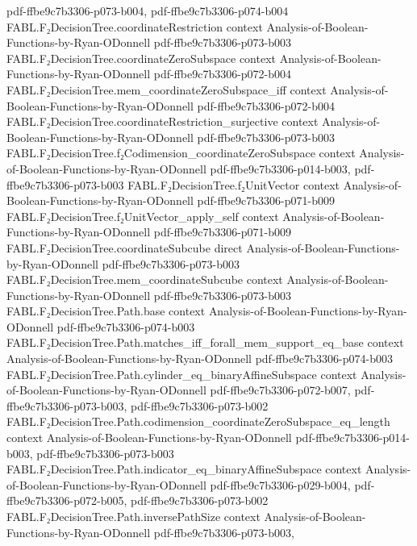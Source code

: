 \begin{theorem}
  {pdf-ffbe9c7b3306-p073-b004,
    pdf-ffbe9c7b3306-p074-b004}
\proofstep
  {FABL.F₂DecisionTree.coordinateRestriction}
  {context}
  {Analysis-of-Boolean-Functions-by-Ryan-ODonnell}
  {pdf-ffbe9c7b3306-p073-b003}
\proofstep
  {FABL.F₂DecisionTree.coordinateZeroSubspace}
  {context}
  {Analysis-of-Boolean-Functions-by-Ryan-ODonnell}
  {pdf-ffbe9c7b3306-p072-b004}
\proofstep
  {FABL.F₂DecisionTree.mem_coordinateZeroSubspace_iff}
  {context}
  {Analysis-of-Boolean-Functions-by-Ryan-ODonnell}
  {pdf-ffbe9c7b3306-p072-b004}
\proofstep
  {FABL.F₂DecisionTree.coordinateRestriction_surjective}
  {context}
  {Analysis-of-Boolean-Functions-by-Ryan-ODonnell}
  {pdf-ffbe9c7b3306-p073-b003}
\proofstep
  {FABL.F₂DecisionTree.f₂Codimension_coordinateZeroSubspace}
  {context}
  {Analysis-of-Boolean-Functions-by-Ryan-ODonnell}
  {pdf-ffbe9c7b3306-p014-b003,
    pdf-ffbe9c7b3306-p073-b003}
\proofstep
  {FABL.F₂DecisionTree.f₂UnitVector}
  {context}
  {Analysis-of-Boolean-Functions-by-Ryan-ODonnell}
  {pdf-ffbe9c7b3306-p071-b009}
\proofstep
  {FABL.F₂DecisionTree.f₂UnitVector_apply_self}
  {context}
  {Analysis-of-Boolean-Functions-by-Ryan-ODonnell}
  {pdf-ffbe9c7b3306-p071-b009}
\proofstep
  {FABL.F₂DecisionTree.coordinateSubcube}
  {direct}
  {Analysis-of-Boolean-Functions-by-Ryan-ODonnell}
  {pdf-ffbe9c7b3306-p073-b003}
\proofstep
  {FABL.F₂DecisionTree.mem_coordinateSubcube}
  {context}
  {Analysis-of-Boolean-Functions-by-Ryan-ODonnell}
  {pdf-ffbe9c7b3306-p073-b003}
\proofstep
  {FABL.F₂DecisionTree.Path.base}
  {context}
  {Analysis-of-Boolean-Functions-by-Ryan-ODonnell}
  {pdf-ffbe9c7b3306-p074-b003}
\proofstep
  {FABL.F₂DecisionTree.Path.matches_iff_forall_mem_support_eq_base}
  {context}
  {Analysis-of-Boolean-Functions-by-Ryan-ODonnell}
  {pdf-ffbe9c7b3306-p074-b003}
\proofstep
  {FABL.F₂DecisionTree.Path.cylinder_eq_binaryAffineSubspace}
  {context}
  {Analysis-of-Boolean-Functions-by-Ryan-ODonnell}
  {pdf-ffbe9c7b3306-p072-b007,
    pdf-ffbe9c7b3306-p073-b003,
    pdf-ffbe9c7b3306-p073-b002}
\proofstep
  {FABL.F₂DecisionTree.Path.codimension_coordinateZeroSubspace_eq_length}
  {context}
  {Analysis-of-Boolean-Functions-by-Ryan-ODonnell}
  {pdf-ffbe9c7b3306-p014-b003,
    pdf-ffbe9c7b3306-p073-b003}
\proofstep
  {FABL.F₂DecisionTree.Path.indicator_eq_binaryAffineSubspace}
  {context}
  {Analysis-of-Boolean-Functions-by-Ryan-ODonnell}
  {pdf-ffbe9c7b3306-p029-b004,
    pdf-ffbe9c7b3306-p072-b005,
    pdf-ffbe9c7b3306-p073-b002}
\proofstep
  {FABL.F₂DecisionTree.Path.inversePathSize}
  {context}
  {Analysis-of-Boolean-Functions-by-Ryan-ODonnell}
  {pdf-ffbe9c7b3306-p073-b003,
}
\end{theorem}
